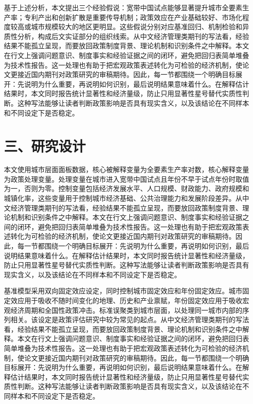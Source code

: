 \documentclass[12pt,a4paper]{article}
\begin{document}
基于上述分析，本文提出三个经验假说：宽带中国试点能够显著提升城市全要素生产率；专利产出和创新扩散是重要传导机制；政策效应在产业基础较好、市场化程度较高或城市规模较大的地区更明显。这些假说分别对应基准回归、机制检验和异质性分析，构成后文实证部分的组织线索。从中文经济管理类期刊的写法看，经验结果不能孤立呈现，而要放回政策制度背景、理论机制和识别条件之中解释。本文在行文上强调问题意识、制度事实和经验证据之间的闭环，避免把回归表简单堆叠为技术性报告。这一处理也有助于把宏观政策表述转化为可检验的经济机制，使论文更接近国内期刊对政策研究的审稿期待。因此，每一节都围绕一个明确目标展开：先说明为什么重要，再说明如何识别，最后说明结果意味着什么。在解释估计结果时，本文同时报告统计显著性和经济量级，防止只用显著性星号替代实质性判断。这种写法能够让读者判断政策影响是否具有现实含义，以及该结论在不同样本和不同设定下是否稳定。

\section*{三、研究设计}
本文使用城市层面面板数据，核心被解释变量为全要素生产率对数，核心解释变量为政策处理变量。处理变量在城市进入宽带中国试点且年份不早于试点年份时取值为一，否则为零。控制变量包括经济发展水平、人口规模、财政能力、政府规模和城镇化率，这些变量用于控制城市经济基础、公共治理能力和发展阶段差异。从中文经济管理类期刊的写法看，经验结果不能孤立呈现，而要放回政策制度背景、理论机制和识别条件之中解释。本文在行文上强调问题意识、制度事实和经验证据之间的闭环，避免把回归表简单堆叠为技术性报告。这一处理也有助于把宏观政策表述转化为可检验的经济机制，使论文更接近国内期刊对政策研究的审稿期待。因此，每一节都围绕一个明确目标展开：先说明为什么重要，再说明如何识别，最后说明结果意味着什么。在解释估计结果时，本文同时报告统计显著性和经济量级，防止只用显著性星号替代实质性判断。这种写法能够让读者判断政策影响是否具有现实含义，以及该结论在不同样本和不同设定下是否稳定。

基准模型采用双向固定效应设定，同时控制城市固定效应和年份固定效应。城市固定效应用于吸收不随时间变化的地理、历史和产业禀赋，年份固定效应用于吸收宏观经济周期和全国性政策冲击。标准误聚类到城市层面，以处理同一城市内部的序列相关。该设定是政策评估研究中较为常见的起点。从中文经济管理类期刊的写法看，经验结果不能孤立呈现，而要放回政策制度背景、理论机制和识别条件之中解释。本文在行文上强调问题意识、制度事实和经验证据之间的闭环，避免把回归表简单堆叠为技术性报告。这一处理也有助于把宏观政策表述转化为可检验的经济机制，使论文更接近国内期刊对政策研究的审稿期待。因此，每一节都围绕一个明确目标展开：先说明为什么重要，再说明如何识别，最后说明结果意味着什么。在解释估计结果时，本文同时报告统计显著性和经济量级，防止只用显著性星号替代实质性判断。这种写法能够让读者判断政策影响是否具有现实含义，以及该结论在不同样本和不同设定下是否稳定。
\end{document}
